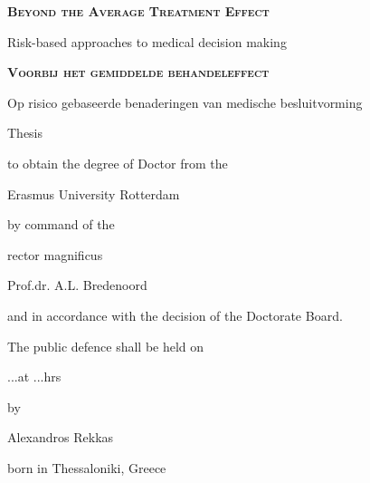 \begin{center}
\textbf{\textsc{Beyond the Average Treatment Effect}}\par
Risk-based approaches to medical decision making \par

\vspace*{1.1cm}

\textbf{\textsc{Voorbij het gemiddelde behandeleffect}}\par
Op risico gebaseerde benaderingen van medische besluitvorming \par

\vspace*{1.4cm}

Thesis \par
to obtain the degree of Doctor from the\par
Erasmus University Rotterdam \par
by command of the \par
rector magnificus \par

\vspace*{0.8cm}

Prof.dr. A.L. Bredenoord \par

\vspace*{0.8cm}

and in accordance with the decision of the Doctorate Board. \par
The public defence shall be held on \par

\vspace*{0.6cm}

...at ...hrs \par

\vspace*{0.6cm}

by \par

\vspace*{0.6cm}

Alexandros Rekkas \par
born in Thessaloniki, Greece

\end{center}

\vspace*{0.8cm}

